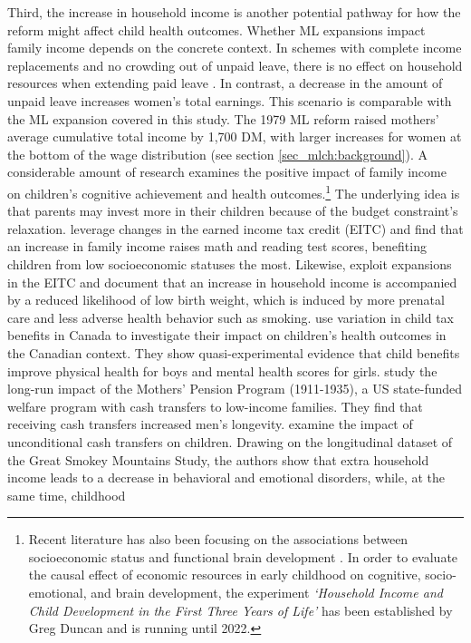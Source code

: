 








Third, the increase in household income is another potential pathway for how the reform might affect child health outcomes. Whether ML expansions impact family income depends on the concrete context. In schemes with complete income replacements and no crowding out of unpaid leave, there is no effect on household resources when extending paid leave \citep{carneiro2015flying,Dahl2016Case,butikofer2018impact}. In contrast, a decrease in the amount of unpaid leave increases women's total earnings. This scenario is comparable with the ML expansion covered in this study. The 1979 ML reform raised mothers' average cumulative total income by 1,700 DM, with larger increases for women at the bottom of the wage distribution (see section \ref{sec_mlch:background}). A considerable amount of research examines the positive impact of family income on children's cognitive achievement and health outcomes.\footnote{Recent literature has also been focusing on the associations between socioeconomic status and functional brain development \citep{tomalski2013}. In order to evaluate the causal effect of economic resources in early childhood on cognitive, socio-emotional, and brain development, the experiment \textit{`Household Income and Child Development in the First Three Years of Life'} has been established by Greg Duncan and is running until 2022.} The underlying idea is that parents may invest more in their children because of the budget constraint's relaxation. \cite{dahl2012impact} leverage changes in the earned income tax credit (EITC) and find that an increase in family income raises math and reading test scores, benefiting children from low socioeconomic statuses the most. Likewise, \cite{hoynes2015income} exploit expansions in the EITC and document that an increase in household income is accompanied by a reduced likelihood of low birth weight, which is induced by more prenatal care and less adverse health behavior such as smoking. \cite{milligan2011taxbenefits} use variation in child tax benefits in Canada to investigate their impact on children's health outcomes in the Canadian context. They show quasi-experimental evidence that child benefits improve physical health for boys and mental health scores for girls. \cite{aizer2016cash-transfer} study the long-run impact of the Mothers' Pension Program (1911-1935), a US state-funded welfare program with cash transfers to low-income families. They find that receiving cash transfers increased men's longevity. \cite{akee2018income} examine the impact of unconditional cash transfers on children. Drawing on the longitudinal dataset of the Great Smokey Mountains Study, the authors show that extra household income leads to a decrease in behavioral and emotional disorders, while, at the same time, childhood 